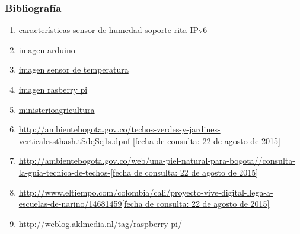 \documentclass[10pt]{beamer}\usepackage[]{graphicx}\usepackage[]{color}
\begin{document}
\begin{frame}
\frametitle{Bibliografía}
	\begin{enumerate}
		\item  \href{http://silicio.mx/sensor-de-humedad-grove}{características sensor de humedad}
		\href{http://rita.udistrital.edu.co/index.php/servicios/servicios-internos/direccionamiento-ipv6-y-dns}{soporte rita IPv6}
		\item \href{	http://articulo.mercadolibre.com.mx/MLM-550669563-arduino-ethernet-shield-generico-atmel-robotica-_JMredirectedFromParent}{imagen arduino}
		\item \href{http://www.reflexiona.biz/shop/temperatura/559--sensor-de-temperatura-lm335a.html}{imagen sensor de temperatura}
		\item \href{http://www.atomsindustries.com/ASD1055}{imagen rasberry pi}
		
		\item \href{https://www.minagricultura.gov.co/}{ministerioagricultura}
		
		\item \href{http://ambientebogota.gov.co/techos-verdes-y-jardines-verticalessthash.tSdqSq1s.dpuf
		}{http://ambientebogota.gov.co/techos-verdes-y-jardines-verticalessthash.tSdqSq1s.dpuf [fecha de consulta: 22 de agosto de 2015]
	}
	
	\item \href{http://ambientebogota.gov.co/web/una-piel-natural-para-bogota//consulta-la-guia-tecnica-de-techos-}{http://ambientebogota.gov.co/web/una-piel-natural-para-bogota//consulta-la-guia-tecnica-de-techos-[fecha de consulta: 22 de agosto de 2015]}
	
	\item \href{http://www.eltiempo.com/colombia/cali/proyecto-vive-digital-llega-a-escuelas-de-narino/14681459}{http://www.eltiempo.com/colombia/cali/proyecto-vive-digital-llega-a-escuelas-de-narino/14681459[fecha de consulta: 22 de agosto de 2015]}
	
	\item \href{http://weblog.aklmedia.nl/tag/raspberry-pi/}{http://weblog.aklmedia.nl/tag/raspberry-pi/}
	
	
	
	
	
\end{enumerate}
\end{frame}
\end{document}
